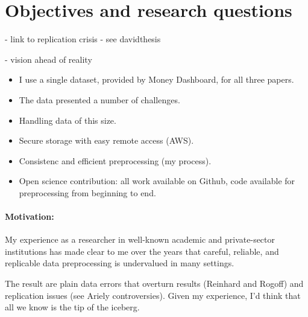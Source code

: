 
\section{Objectives and research questions}%
\label{sec:objectives}










- link to replication crisis - see davidthesis


- vision ahead of reality

\begin{itemize}
    \item I use a single dataset, provided by Money Dashboard, for all three
        papers.

    \item The data presented a number of challenges.

    \item Handling data of this size.

    \item Secure storage with easy remote access (AWS).

    \item Consistenc and efficient preprocessing (my process).

    \item Open science contribution: all work available on Github, code
        available for preprocessing from beginning to end.
\end{itemize}

\paragraph{Motivation:}%
\label{par:motivation_}

My experience as a researcher in well-known academic and private-sector
institutions has made clear to me over the years that careful, reliable, and
replicable data preprocessing is undervalued in many settings.

The result are plain data errors that overturn results (Reinhard and Rogoff)
and replication issues (see Ariely controversies). Given my experience, I'd
think that all we know is the tip of the iceberg.

